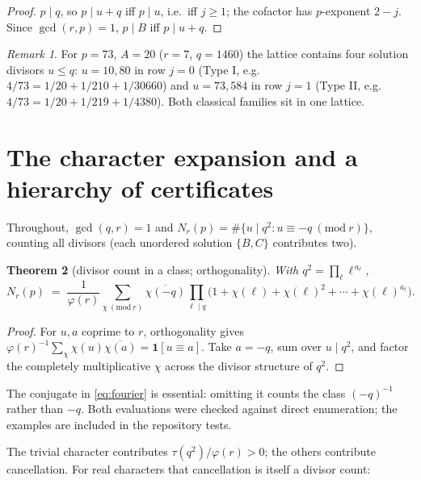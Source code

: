 \documentclass[11pt]{article}
\newtheorem{theorem}{Theorem}[section]
\theoremstyle{definition}
\theoremstyle{remark}
\newtheorem{remark}[theorem]{Remark}
\begin{document}
\begin{proof}
$p \mid q$, so $p \mid u + q$ iff $p \mid u$, i.e.\ iff $j \ge 1$; the cofactor has
$p$-exponent $2-j$. Since $\gcd(r,p)=1$, $p \mid B$ iff $p \mid u+q$.
\end{proof}

\begin{remark}
For $p = 73$, $A = 20$ ($r = 7$, $q = 1460$) the lattice contains four solution
divisors $u \le q$: $u = 10, 80$ in row $j = 0$ (Type I, e.g.\
$4/73 = 1/20 + 1/210 + 1/30660$) and $u = 73, 584$ in row $j = 1$ (Type II, e.g.\
$4/73 = 1/20 + 1/219 + 1/4380$). Both classical families sit in one lattice.
\end{remark}

\section{The character expansion and a hierarchy of certificates}\label{sec:fourier}

Throughout, $\gcd(q,r) = 1$ and
$N_r(p) = \#\{u \mid q^2 : u \equiv -q \ (\mathrm{mod}\ r)\}$, counting all divisors
(each unordered solution $\{B,C\}$ contributes two).

\begin{theorem}[divisor count in a class; orthogonality]\label{thm:fourier}
With $q^2 = \prod_\ell \ell^{\,a_\ell}$,
\begin{equation}\label{eq:fourier}
N_r(p) \;=\; \frac{1}{\varphi(r)} \sum_{\chi \ (\mathrm{mod}\ r)}
\overline{\chi(-q)} \prod_{\ell \mid q}
\bigl( 1 + \chi(\ell) + \chi(\ell)^2 + \cdots + \chi(\ell)^{a_\ell} \bigr).
\end{equation}
\end{theorem}

\begin{proof}
For $u, a$ coprime to $r$, orthogonality \cite[Ch.~4]{Davenport2000} gives
$\varphi(r)^{-1}\sum_\chi \chi(u)\overline{\chi(a)} = \mathbf{1}[u \equiv a]$. Take
$a = -q$, sum over $u \mid q^2$, and factor the completely multiplicative $\chi$ across
the divisor structure of $q^2$.
\end{proof}

The conjugate in \eqref{eq:fourier} is essential: omitting it counts the class
$(-q)^{-1}$ rather than $-q$. Both evaluations were checked against direct
enumeration; the examples are included in the repository tests.

The trivial character contributes $\tau(q^2)/\varphi(r) > 0$; the others contribute
cancellation. For real characters that cancellation is itself a divisor count:
\end{document}
